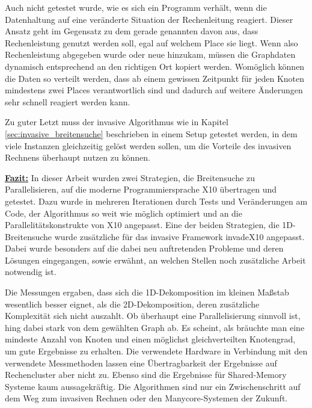 Auch nicht getestet wurde, wie es sich ein Programm verhält, wenn die Datenhaltung auf eine veränderte Situation der Rechenleitung reagiert. Dieser Ansatz geht im Gegensatz zu dem gerade genannten davon aus, dass Rechenleistung genutzt werden soll, egal auf welchem Place sie liegt. Wenn also Rechenleistung abgegeben wurde oder neue hinzukam, müssen die Graphdaten dynamisch entsprechend an den richtigen Ort kopiert werden. Womöglich können die Daten so verteilt werden, dass ab einem gewissen Zeitpunkt für jeden Knoten mindestens zwei Places verantwortlich sind und dadurch auf weitere Änderungen sehr schnell reagiert werden kann.

Zu guter Letzt muss der invasive Algorithmus wie in Kapitel \ref{sec:invasive_breitensuche} beschrieben in einem Setup getestet werden, in dem viele Instanzen gleichzeitig gelöst werden sollen, um die Vorteile des invasiven Rechnens überhaupt nutzen zu können.

\underline{\textbf{Fazit:}}
In dieser Arbeit wurden zwei Strategien, die Breitensuche zu Parallelisieren, auf die moderne Programmiersprache X10 übertragen und getestet. Dazu wurde in mehreren Iterationen durch Tests und Veränderungen am Code, der Algorithmus so weit wie möglich optimiert und an die Parallelitätskonstrukte von X10 angepasst. Eine der beiden Strategien, die 1D-Breitensuche wurde zusätzliche für das invasive Framework invadeX10 angepasst. Dabei wurde besonders auf die dabei neu auftretenden Probleme und deren Lösungen eingegangen, sowie erwähnt, an welchen Stellen noch zusätzliche Arbeit notwendig ist.

Die Messungen ergaben, dass sich die 1D-Dekomposition im kleinen Maßstab wesentlich besser eignet, als die 2D-Dekomposition, deren zusätzliche Komplexität sich nicht auszahlt. Ob überhaupt eine Parallelisierung sinnvoll ist, hing dabei stark von dem gewählten Graph ab. Es scheint, als bräuchte man eine mindeste Anzahl von Knoten und einen möglichst gleichverteilten Knotengrad, um gute Ergebnisse zu erhalten. Die verwendete Hardware in Verbindung mit den verwendete Messmethoden lassen eine Übertragbarkeit der Ergebnisse auf Rechencluster aber nicht zu. Ebenso sind die Ergebnisse für Shared-Memory Systeme kaum aussagekräftig. Die Algorithmen sind nur ein Zwischenschritt auf dem Weg zum invasiven Rechnen oder den Manycore-Systemen der Zukunft.


